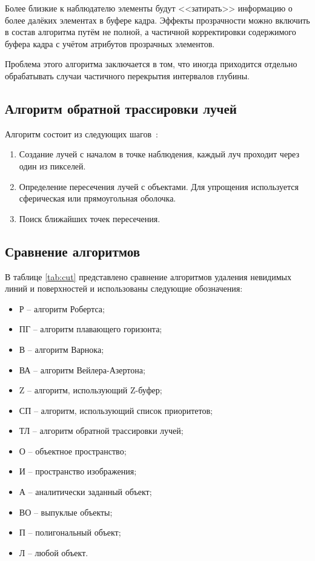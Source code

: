 Более близкие к наблюдателю элементы будут <<затирать>> информацию о более далёких элементах в буфере кадра. Эффекты прозрачности можно включить в состав алгоритма путём не полной, а частичной корректировки содержимого буфера кадра с учётом атрибутов прозрачных элементов.

Проблема этого алгоритма заключается в том, что иногда приходится отдельно обрабатывать случаи частичного перекрытия интервалов глубины.

\subsection{Алгоритм обратной трассировки лучей}

Алгоритм состоит из следующих шагов~\cite{golovnin}:

\begin{enumerate}[label=\arabic*.]
	\item Создание лучей с началом в точке наблюдения, каждый луч проходит через один из пикселей.
	\item Определение пересечения лучей с объектами. Для упрощения используется сферическая или прямоугольная оболочка.
	\item Поиск ближайших точек пересечения. 
\end{enumerate}

\subsection{Сравнение алгоритмов}

В таблице \ref{tab:cut} представлено сравнение алгоритмов удаления невидимых линий и поверхностей и использованы следующие обозначения:

\begin{itemize}
	\item Р -- алгоритм Робертса;
	\item ПГ -- алгоритм плавающего горизонта;
	\item В -- алгоритм Варнока;
	\item ВА -- алгоритм Вейлера-Азертона;
	\item Z -- алгоритм, использующий Z-буфер;
	\item СП -- алгоритм, использующий список приоритетов;
	\item ТЛ -- алгоритм обратной трассировки лучей;
	\item О -- объектное пространство;
	\item И -- пространство изображения;
	\item А -- аналитически заданный объект;
	\item ВО -- выпуклые объекты;
	\item П -- полигональный объект;
	\item Л -- любой объект.
\end{itemize}

